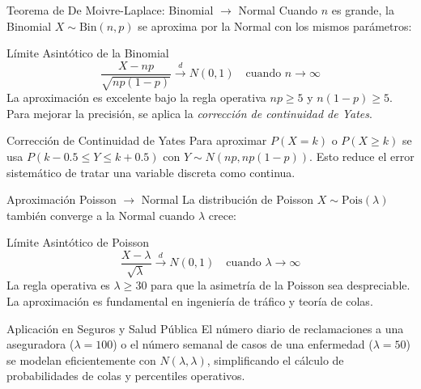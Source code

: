 \documentclass[10pt, aspectratio=169]{beamer}
\begin{document}
\begin{frame}{Teorema de De Moivre-Laplace: Binomial $\to$ Normal}
  \footnotesize
  Cuando $n$ es grande, la Binomial $X \sim \text{Bin}(n, p)$ se aproxima por la Normal con los mismos parámetros: \pause

  \vspace{0.1cm}
  \begin{block}{Límite Asintótico de la Binomial}
    $$\dfrac{X - np}{\sqrt{np(1-p)}} \xrightarrow{d} N(0, 1) \quad \text{cuando } n \to \infty$$
    La aproximación es excelente bajo la regla operativa $np \ge 5$ y $n(1-p) \ge 5$. Para mejorar la precisión, se aplica la \emph{corrección de continuidad de Yates}.
  \end{block}

  \vspace{0.1cm}
  \pause
  \begin{alertblock}{Corrección de Continuidad de Yates}
    Para aproximar $P(X = k)$ o $P(X \ge k)$ se usa $P(k - 0.5 \le Y \le k + 0.5)$ con $Y \sim N(np, np(1-p))$. Esto reduce el error sistemático de tratar una variable discreta como continua.
  \end{alertblock}
\end{frame}

\begin{frame}{Aproximación Poisson $\to$ Normal}
  \footnotesize
  La distribución de Poisson $X \sim \text{Pois}(\lambda)$ también converge a la Normal cuando $\lambda$ crece: \pause

  \vspace{0.1cm}
  \begin{block}{Límite Asintótico de Poisson}
    $$\dfrac{X - \lambda}{\sqrt{\lambda}} \xrightarrow{d} N(0, 1) \quad \text{cuando } \lambda \to \infty$$
    La regla operativa es $\lambda \ge 30$ para que la asimetría de la Poisson sea despreciable. La aproximación es fundamental en ingeniería de tráfico y teoría de colas.
  \end{block}

  \vspace{0.1cm}
  \pause
  \begin{alertblock}{Aplicación en Seguros y Salud Pública}
    El número diario de reclamaciones a una aseguradora ($\lambda = 100$) o el número semanal de casos de una enfermedad ($\lambda = 50$) se modelan eficientemente con $N(\lambda, \lambda)$, simplificando el cálculo de probabilidades de colas y percentiles operativos.
  \end{alertblock}
\end{frame}
\end{document}
